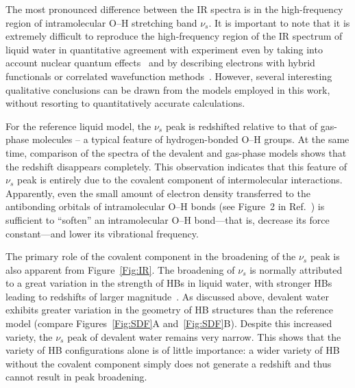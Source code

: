 \documentclass[10pt,amsmath,twocolumn,aps,prl,superscriptaddress,floatfix]{revtex4-1}
\begin{document}
The most pronounced difference between the IR spectra is in the high-frequency region of intramolecular O--H stretching band $\nu_s$. 
%
It is important to note that it is extremely difficult to reproduce the high-frequency region of the IR spectrum of liquid water in quantitative agreement with experiment even by taking into account nuclear quantum effects~\cite{marsalek2017quantum} and by describing electrons with hybrid functionals or correlated wavefunction methods~\cite{medders2015infrared}. 
However, several interesting qualitative conclusions can be drawn from the models employed in this work, without resorting to quantitatively accurate calculations. 

For the reference liquid model, the $\nu_s$ peak is redshifted relative to that of gas-phase molecules -- a typical feature of hydrogen-bonded O--H groups.
At the same time, comparison of the spectra of the devalent and gas-phase models shows that the redshift disappears completely. 
This observation indicates that this feature of $\nu_s$ peak is entirely due to the covalent component of intermolecular interactions. 
Apparently, even the small amount of electron density transferred to the antibonding orbitals of intramolecular O--H bonds (see Figure~2 in Ref.~) is sufficient to ``soften'' an intramolecular O--H bond---that is, decrease its force constant---and lower its vibrational frequency. 

The primary role of the covalent component in the broadening of the $\nu_s$ peak is also apparent from Figure~\ref{Fig:IR}. 
The broadening of $\nu_s$ is normally attributed to a great variation in the strength of HBs in liquid water, with stronger HBs leading to redshifts of larger magnitude~\cite{joseph2007red}. 
As discussed above, devalent water exhibits greater variation in the geometry of HB structures than the reference model (compare Figures~\ref{Fig:SDF}A and~\ref{Fig:SDF}B). 
Despite this increased variety, the $\nu_s$ peak of devalent water remains very narrow. This shows that the variety of HB configurations alone is of little importance: a wider variety of HB without the covalent component simply does not generate a redshift and thus cannot result in peak broadening. 
\end{document}
